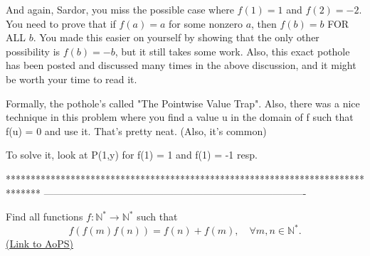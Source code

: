 \begin{solution}
	\begin{tcolorbox}And again, Sardor, you miss the possible case where $f(1)=1$ and $f(2)=-2$.  You need to prove that if $f(a)=a$ for some nonzero $a$, then $f(b)=b$ FOR ALL $b$.  You made this easier on yourself by showing that the only other possibility is $f(b)=-b$, but it still takes some work.  Also, this exact pothole has been posted and discussed many times in the above discussion, and it might be worth your time to read it.\end{tcolorbox}

Formally, the pothole's called "The Pointwise Value Trap". Also, there was a nice technique in this problem where you find a value u in the domain of f such that f(u) = 0 and use it. That's pretty neat. (Also, it's common)

To solve it, look at P(1,y) for f(1) = 1 and f(1) = -1 resp.
\end{solution}
*******************************************************************************
-------------------------------------------------------------------------------

\begin{problem}
	Find all functions $f: \mathbb N^* \to \mathbb N^*$ such that
 \[f(f(m)f(n))=f(n)+f(m),\quad \forall m,n \in\mathbb N^{*}.\]
	\flushright \href{https://artofproblemsolving.com/community/c6h56559}{(Link to AoPS)}
\end{problem}



